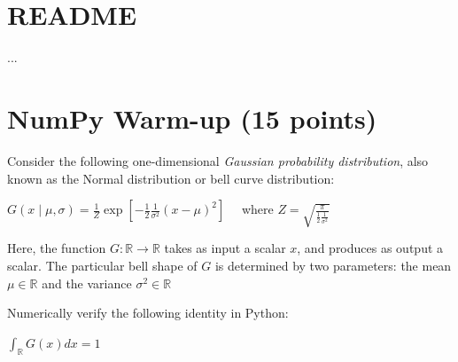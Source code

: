 \documentclass[10pt]{article}
\title{\documenttitle \vspace{1ex} \\ \Large \coursetitle \vspace{-1ex}}
\author{\authorname\vspace{-1ex}}
\begin{document}
\maketitle


\section{README}

... 

\section{NumPy Warm-up (15 points)}

Consider the following one-dimensional \textit{Gaussian probability distribution}, also known as the Normal distribution or bell curve distribution:

\begin{center}
$
G(x \mid \mu, \sigma)=\frac{1}{Z} \exp \left[-\frac{1}{2} \frac{1}{\sigma^{2}}(x-\mu)^{2}\right] \quad
$
where 
$
Z=\sqrt{\frac{\pi}{\frac{1}{2} \frac{1}{\sigma^{2}}}}
$
\end{center}

Here, the function $G : \mathbb{R} \rightarrow \mathbb{R}$ takes as input a scalar $x$, and produces as output a scalar. 
The particular bell shape of $G$ is determined by two parameters: the mean $\mu \in \mathbb{R}$ and the variance $\sigma^2 \in \mathbb{R}$

Numerically verify the following identity in Python:

\begin{center}
$\int_{\mathbb{R}} G(x) d x=1$
\end{center}
\end{document}
